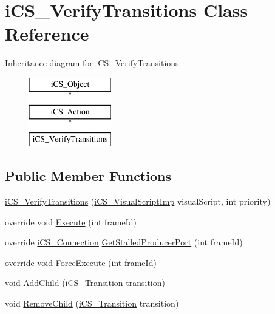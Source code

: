 \hypertarget{classi_c_s___verify_transitions}{\section{i\+C\+S\+\_\+\+Verify\+Transitions Class Reference}
\label{classi_c_s___verify_transitions}
}
Inheritance diagram for i\+C\+S\+\_\+\+Verify\+Transitions\+:\begin{figure}[H]
\begin{center}
\leavevmode
\includegraphics[height=3.000000cm]{classi_c_s___verify_transitions}
\end{center}
\end{figure}
\subsection*{Public Member Functions}
\begin{DoxyCompactItemize}
\item 
\hyperlink{classi_c_s___verify_transitions_a70694ff702a0d8414e3fb6dab5f11f9c}{i\+C\+S\+\_\+\+Verify\+Transitions} (\hyperlink{classi_c_s___visual_script_imp}{i\+C\+S\+\_\+\+Visual\+Script\+Imp} visual\+Script, int priority)
\item 
override void \hyperlink{classi_c_s___verify_transitions_a42b4fde39a65640dcb1744ad8be2583e}{Execute} (int frame\+Id)
\item 
override \hyperlink{classi_c_s___connection}{i\+C\+S\+\_\+\+Connection} \hyperlink{classi_c_s___verify_transitions_a51de80e0ba4b2048343611beb6725a68}{Get\+Stalled\+Producer\+Port} (int frame\+Id)
\item 
override void \hyperlink{classi_c_s___verify_transitions_ade6fb9a3d760b2bc558e49ffc6f1885f}{Force\+Execute} (int frame\+Id)
\item 
void \hyperlink{classi_c_s___verify_transitions_a02a7f652f397853374108f66472b7346}{Add\+Child} (\hyperlink{classi_c_s___transition}{i\+C\+S\+\_\+\+Transition} transition)
\item 
void \hyperlink{classi_c_s___verify_transitions_a82c49fd64441024fe8ee9213337b5f78}{Remove\+Child} (\hyperlink{classi_c_s___transition}{i\+C\+S\+\_\+\+Transition} transition)
\end{DoxyCompactItemize}
